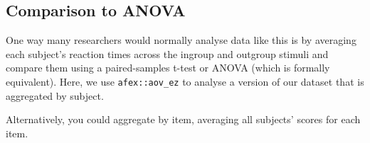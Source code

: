\documentclass[man,floatsintext]{apa6}
\newenvironment{Shaded}{\begin{snugshade}}{\end{snugshade}}
\newcommand{\CommentTok}[1]{\textcolor[rgb]{0.56,0.35,0.01}{\textit{#1}}}
\newcommand{\DataTypeTok}[1]{\textcolor[rgb]{0.13,0.29,0.53}{#1}}
\newcommand{\KeywordTok}[1]{\textcolor[rgb]{0.13,0.29,0.53}{\textbf{#1}}}
\newcommand{\NormalTok}[1]{#1}
\newcommand{\OperatorTok}[1]{\textcolor[rgb]{0.81,0.36,0.00}{\textbf{#1}}}
\newcommand{\StringTok}[1]{\textcolor[rgb]{0.31,0.60,0.02}{#1}}
\begin{document}
\hypertarget{comparison-to-anova}{%
\subsection{Comparison to ANOVA}\label{comparison-to-anova}}

One way many researchers would normally analyse data like this is by averaging each subject's reaction times across the ingroup and outgroup stimuli and compare them using a paired-samples t-test or ANOVA (which is formally equivalent). Here, we use \texttt{afex::aov\_ez} to analyse a version of our dataset that is aggregated by subject.

\begin{Shaded}
\end{Shaded}

Alternatively, you could aggregate by item, averaging all subjects' scores for each item.

\begin{Shaded}
\end{Shaded}
\end{document}

